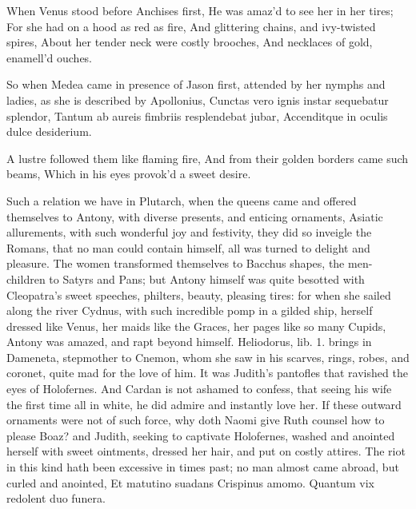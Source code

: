 {When Venus stood before Anchises first,
He was amaz'd to see her in her tires;
For she had on a hood as red as fire,
And glittering chains, and ivy-twisted spires,
About her tender neck were costly brooches,
And necklaces of gold, enamell'd ouches.

So when Medea came in presence of Jason first, attended by her nymphs
and ladies, as she is described by Apollonius,
Cunctas vero ignis instar sequebatur splendor,
Tantum ab aureis fimbriis resplendebat jubar,
Accenditque in oculis dulce desiderium.

A lustre followed them like flaming fire,
And from their golden borders came such beams,
Which in his eyes provok'd a sweet desire.

Such a relation we have in Plutarch, when the queens came and
offered themselves to Antony, with diverse presents, and enticing
ornaments, Asiatic allurements, with such wonderful joy and festivity,
they did so inveigle the Romans, that no man could contain himself, all
was turned to delight and pleasure. The women transformed themselves to
Bacchus shapes, the men-children to Satyrs and Pans; but Antony himself
was quite besotted with Cleopatra's sweet speeches, philters, beauty,
pleasing tires: for when she sailed along the river Cydnus, with such
incredible pomp in a gilded ship, herself dressed like Venus, her maids
like the Graces, her pages like so many Cupids, Antony was amazed, and
rapt beyond himself. Heliodorus, lib. 1. brings in Dameneta, stepmother
to Cnemon, whom she saw in his scarves, rings, robes, and
coronet, quite mad for the love of him. It was Judith's pantofles that
ravished the eyes of Holofernes. And Cardan is not ashamed to
confess, that seeing his wife the first time all in white, he did
admire and instantly love her. If these outward ornaments were not of
such force, why doth Naomi give Ruth counsel how to please Boaz?
and Judith, seeking to captivate Holofernes, washed and anointed
herself with sweet ointments, dressed her hair, and put on costly
attires. The riot in this kind hath been excessive in times past; no
man almost came abroad, but curled and anointed,
Et matutino suadans Crispinus amomo.
Quantum vix redolent duo funera.

}
